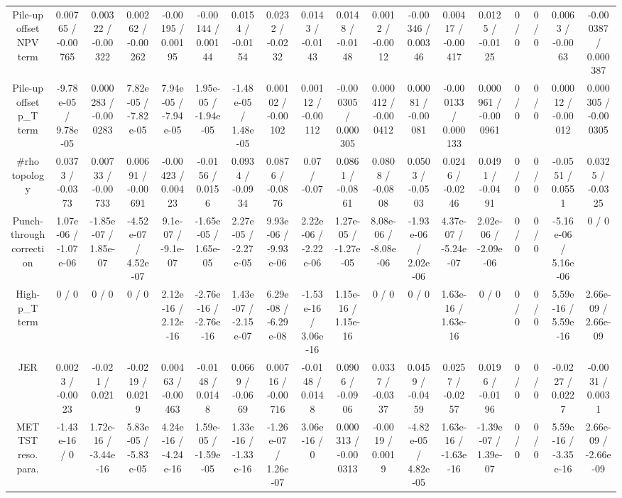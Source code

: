 \documentclass[10pt]{article}
\begin{document}
\begin{table}[htbp]
\begin{center}
\begin{tabular}{|c|c|c|c|c|c|c|c|c|c|c|c|c|c|c|c|c|c|}
  Pile-up offset NPV term & 0.00765 / -0.00765 & 0.00322 / -0.00322 & 0.00262 / -0.00262 & -0.00195 / 0.00195 & -0.00144 / 0.00144 & 0.0154 / -0.0154 & 0.0232 / -0.0232 & 0.0143 / -0.0143 & 0.0148 / -0.0148 & 0.0012 / -0.0012 & -0.00346 / 0.00346 & 0.00417 / -0.00417 & 0.0125 / -0.0125 & 0 / 0 & 0 / 0 & 0.0063 / -0.0063 & -0.000387 / 0.000387 \\ 
  Pile-up offset p_{T} term & -9.78e-05 / 9.78e-05 & 0.000283 / -0.000283 & 7.82e-05 / -7.82e-05 & 7.94e-05 / -7.94e-05 & 1.95e-05 / -1.94e-05 & -1.48e-05 / 1.48e-05 & 0.00102 / -0.00102 & 0.00112 / -0.00112 & -0.000305 / 0.000305 & 0.000412 / -0.000412 & 0.00081 / -0.00081 & -0.000133 / 0.000133 & 0.000961 / -0.000961 & 0 / 0 & 0 / 0 & 0.00012 / -0.00012 & 0.000305 / -0.000305 \\ 
  #rho topology & 0.0373 / -0.0373 & 0.00733 / -0.00733 & 0.00691 / -0.00691 & -0.00423 / 0.00423 & -0.0156 / 0.0156 & 0.0934 / -0.0934 & 0.0876 / -0.0876 & 0.07 / -0.07 & 0.0861 / -0.0861 & 0.0808 / -0.0808 & 0.0503 / -0.0503 & 0.0246 / -0.0246 & 0.0491 / -0.0491 & 0 / 0 & 0 / 0 & -0.0551 / 0.0551 & 0.0325 / -0.0325 \\ 
  Punch-through correction & 1.07e-06 / -1.07e-06 & -1.85e-07 / 1.85e-07 & -4.52e-07 / 4.52e-07 & 9.1e-07 / -9.1e-07 & -1.65e-05 / 1.65e-05 & 2.27e-05 / -2.27e-05 & 9.93e-06 / -9.93e-06 & 2.22e-06 / -2.22e-06 & 1.27e-05 / -1.27e-05 & 8.08e-06 / -8.08e-06 & -1.93e-06 / 2.02e-06 & 4.37e-07 / -5.24e-07 & 2.02e-06 / -2.09e-06 & 0 / 0 & 0 / 0 & -5.16e-06 / 5.16e-06 & 0 / 0 \\ 
  High-p_{T} term & 0 / 0 & 0 / 0 & 0 / 0 & 2.12e-16 / 2.12e-16 & -2.76e-16 / -2.76e-16 & 1.43e-07 / -2.15e-07 & 6.29e-08 / -6.29e-08 & -1.53e-16 / 3.06e-16 & 1.15e-16 / 1.15e-16 & 0 / 0 & 0 / 0 & 1.63e-16 / 1.63e-16 & 0 / 0 & 0 / 0 & 0 / 0 & 5.59e-16 / 5.59e-16 & 2.66e-09 / 2.66e-09 \\ 
  JER & 0.0023 / -0.0023 & -0.021 / 0.021 & -0.0219 / 0.0219 & 0.00463 / -0.00463 & -0.0148 / 0.0148 & 0.0669 / -0.0669 & 0.00716 / -0.00716 & -0.0148 / 0.0148 & 0.0906 / -0.0906 & 0.0337 / -0.0337 & 0.0459 / -0.0459 & 0.0257 / -0.0257 & 0.0196 / -0.0196 & 0 / 0 & 0 / 0 & -0.0227 / 0.0227 & -0.0031 / 0.0031 \\ 
  MET TST reso. para. & -1.43e-16 / 0 & 1.72e-16 / -3.44e-16 & 5.83e-05 / -5.83e-05 & 4.24e-16 / -4.24e-16 & 1.59e-05 / -1.59e-05 & 1.33e-16 / -1.33e-16 & -1.26e-07 / 1.26e-07 & 3.06e-16 / 0 & 0.000313 / -0.000313 & -0.0019 / 0.0019 & -4.82e-05 / 4.82e-05 & 1.63e-16 / -1.63e-16 & -1.39e-07 / 1.39e-07 & 0 / 0 & 0 / 0 & 5.59e-16 / -3.35e-16 & 2.66e-09 / -2.66e-09 \\ 

\end{tabular}
\end{center}
\end{table}
\end{document}
